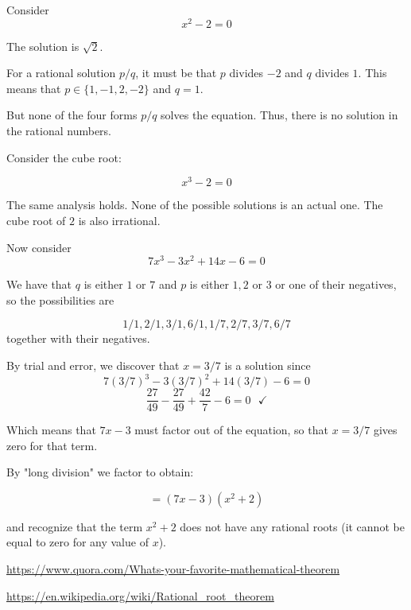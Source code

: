 \documentclass[11pt, oneside]{article}
\begin{document}
Consider
\[ x^2 - 2 = 0 \]

The solution is $\sqrt{2}$.  

For a rational solution $p/q$, it must be that $p$ divides $-2$ and $q$ divides $1$.   This means that $p \in \{ 1,-1,2,-2 \}$ and $q = 1$.

But none of the four forms $p/q$ solves the equation.  Thus, there is no solution in the rational numbers.

Consider the cube root:

\[ x^3 - 2 = 0 \]

The same analysis holds.  None of the possible solutions is an actual one.  The cube root of $2$ is also irrational.

Now consider
\[ 7x^3 - 3x^2 + 14x - 6 = 0 \]

We have that $q$ is either $1$ or $7$ and $p$ is either $1,2$ or $3$  or one of their negatives, so the possibilities are

\[ 1/1, 2/1, 3/1, 6/1, 1/7, 2/7, 3/7, 6/7 \]
together with their negatives.  

By trial and error, we discover that $x = 3/7$ is a solution since
\[ 7 (3/7)^3 - 3(3/7)^2 + 14(3/7) - 6 = 0 \]
\[ \frac{27}{49} - \frac{27}{49} + \frac{42}{7} - 6 = 0 \ \ \ \checkmark \]

Which means that $7x - 3$ must factor out of the equation, so that $x = 3/7$ gives zero for that term.  

By "long division" we factor to obtain:

\[ = (7x - 3)(x^2 + 2) \]

and recognize that the term $x^2 + 2$ does not have any rational roots (it cannot be equal to zero for any value of $x$).

\url{https://www.quora.com/Whats-your-favorite-mathematical-theorem}

\url{https://en.wikipedia.org/wiki/Rational_root_theorem}
\end{document}
